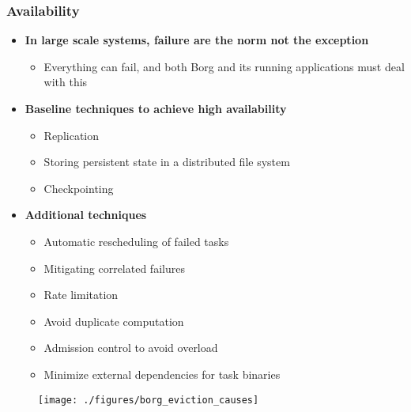 \begin{frame}
\frametitle{Availability}
\begin{itemize}
	\item {\bf In large scale systems, failure are the norm not the exception}
	\begin{itemize}
		\item Everything can fail, and both Borg and its running applications must deal with this
	\end{itemize}
	\item {\bf Baseline techniques to achieve high availability}
	\begin{itemize}
		\item Replication
		\item Storing persistent state in a distributed file system
		\item Checkpointing
	\end{itemize}
	\item {\bf Additional techniques}
	\begin{itemize}
		\item Automatic rescheduling of failed tasks
		\item Mitigating correlated failures
		\item Rate limitation
		\item Avoid duplicate computation
		\item Admission control to avoid overload
		\item Minimize external dependencies for task binaries
	\end{itemize}
\end{itemize}
\begin{figure}[h]
  \centering
  \texttt{[image: ./figures/borg\_eviction\_causes]}
  \label{fig:borg_eviction_causes}
\end{figure}

\end{frame}

